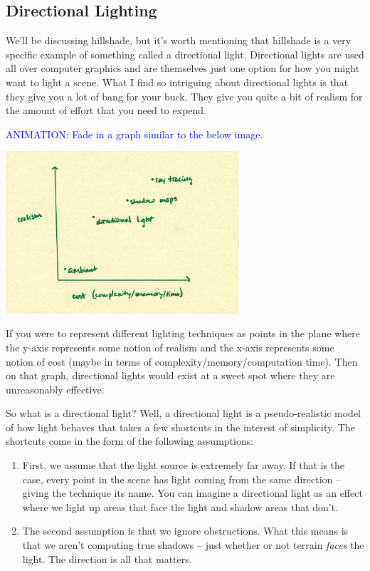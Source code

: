 \documentclass{article}
\newcommand\animation[1]{\textcolor{blue}{ANIMATION: #1}}
\begin{document}
\subsection{Directional Lighting}

We'll be discussing hillshade, but it's worth mentioning that hillshade is a very specific example of something called a directional light.
Directional lights are used all over computer graphics and are themselves just one option for how you might want to light a scene.
What I find so intriguing about directional lights is that they give you a lot of bang for your buck.
They give you quite a bit of realism for the amount of effort that you need to expend.

\animation{Fade in a graph similar to the below image.}

\begin{center}
	\includegraphics[width=0.65\textwidth,frame]{assets/realism.jpg}
\end{center}

If you were to represent different lighting techniques as points in the plane where the y-axis represents some notion of realism and the x-axis represents some notion of cost (maybe in terms of complexity/memory/computation time).
Then on that graph, directional lights would exist at a sweet spot where they are unreasonably effective.

So what is a directional light?
Well, a directional light is a pseudo-realistic model of how light behaves that takes a few shortcuts in the interest of simplicity.
The shortcuts come in the form of the following assumptions:

\begin{enumerate}
	
\item First, we assume that the light source is extremely far away.
If that is the case, every point in the scene has light coming from the same direction -- giving the technique its name.
You can imagine a directional light as an effect where we light up areas that face the light and shadow areas that don't.

\item The second assumption is that we ignore obstructions.
What this means is that we aren't computing true shadows -- just whether or not terrain \textit{faces} the light.
The direction is all that matters.

\end{enumerate}
\end{document}
